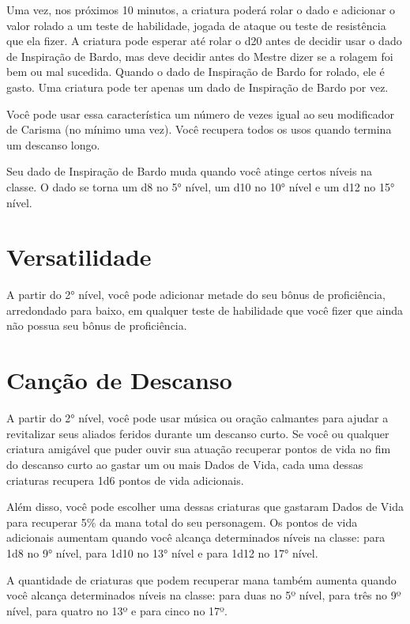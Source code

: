 \begin{multicols}{2}
Uma vez, nos próximos 10 minutos, a criatura poderá rolar o dado e adicionar o
valor rolado a um teste de habilidade, jogada de ataque ou teste de resistência
que ela fizer. A criatura pode esperar até rolar o d20 antes de decidir usar o
dado de Inspiração de Bardo, mas deve decidir antes do Mestre dizer se a rolagem
foi bem ou mal sucedida. Quando o dado de Inspiração de Bardo for rolado, ele é
gasto. Uma criatura pode ter apenas um dado de Inspiração de Bardo por vez.

Você pode usar essa característica um número de vezes igual ao seu modificador
de Carisma (no mínimo uma vez). Você recupera todos os usos quando termina um
descanso longo.

Seu dado de Inspiração de Bardo muda quando você atinge certos níveis na classe.
O dado se torna um d8 no 5° nível, um d10 no 10° nível e um d12 no 15° nível.

\section*{Versatilidade}%

A partir do 2° nível, você pode adicionar metade do seu bônus de proficiência,
arredondado para baixo, em qualquer teste de habilidade que você fizer que ainda
não possua seu bônus de proficiência.

\section*{Canção de Descanso}%

A partir do 2° nível, você pode usar música ou oração calmantes para ajudar a
revitalizar seus aliados feridos durante um descanso curto. Se você ou qualquer
criatura amigável que puder ouvir sua atuação recuperar pontos de vida no fim do
descanso curto ao gastar um ou mais Dados de Vida, cada uma dessas criaturas
recupera 1d6 pontos de vida adicionais.

Além disso, você pode escolher uma dessas criaturas que gastaram Dados de Vida
para recuperar 5\% da mana total do seu personagem.
Os pontos de vida adicionais aumentam quando você alcança determinados níveis na
classe: para 1d8 no 9° nível, para 1d10 no 13° nível e para 1d12 no 17°
nível.

A quantidade de criaturas que podem recuperar mana também aumenta quando você
alcança determinados níveis na classe: para duas no 5º nível, para três no
9º nível, para quatro no 13º e para cinco no 17º.


\end{multicols}
